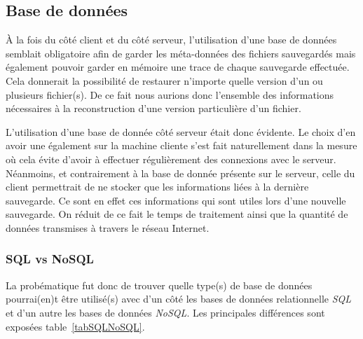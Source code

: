 \documentclass[a4paper,10pt, twoside]{report}
\begin{document}
\begin{spacing}{1.2}
\subsection{Base de donn\'ees}
\`A la fois du c\^ot\'e client et du c\^ot\'e serveur, l'utilisation d'une
base de donn\'ees semblait obligatoire afin de garder les m\'eta-donn\'ees
des fichiers sauvegard\'es mais \'egalement pouvoir garder en m\'emoire une
trace de chaque sauvegarde effectu\'ee. Cela donnerait la possibilit\'e
de restaurer n'importe quelle version d'un ou plusieurs fichier(s). De ce fait
nous aurions donc l'ensemble des informations n\'ecessaires \`a la
reconstruction d'une version particuli\`ere d'un fichier.

L'utilisation d'une base de donn\'ee c\^ot\'e serveur \'etait donc \'evidente.
Le choix d'en avoir une \'egalement sur la machine cliente s'est fait
naturellement dans la mesure o\`u cela \'evite d'avoir \`a effectuer
r\'eguli\`erement des connexions avec le serveur. N\'eanmoins, et contrairement
\`a la base de donn\'ee pr\'esente sur le serveur, celle du client permettrait
de ne stocker que les informations li\'ees \`a la derni\`ere sauvegarde. Ce
sont en effet ces informations qui sont utiles lors d'une nouvelle sauvegarde.
On r\'eduit de ce fait le temps de traitement ainsi que la quantit\'e de
donn\'ees transmises \`a travers le r\'eseau Internet.

\subsubsection{SQL vs NoSQL}
La prob\'ematique fut donc de trouver quelle type(s) de base de donn\'ees
pourrai(en)t \^etre utilis\'e(s) avec d'un c\^ot\'e les bases de donn\'ees
relationnelle \textit{SQL} et d'un autre les bases de donn\'ees \textit{NoSQL}.
Les principales diff\'erences sont expos\'ees table~\ref{tabSQLNoSQL}.


\end{spacing}
\end{document}
